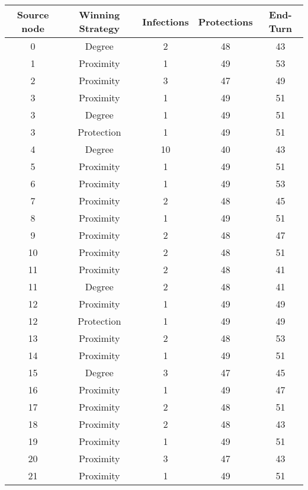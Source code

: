 \documentclass[results.tex]{subfiles}
\begin{document}
\begin{center}
  \begin{tabular}{| c || c | c | c | c |}
    \hline
    {\bfseries Source node} & {\bfseries Winning Strategy} & {\bfseries Infections} & {\bfseries Protections} & {\bfseries End-Turn} \\  %
    \hline\hline
    0 & Degree & 2 & 48 & 43 \\ 
    \hline
    1 & Proximity & 1 & 49 & 53 \\ 
    \hline
    2 & Proximity & 3 & 47 & 49 \\ 
    \hline
    3 & Proximity & 1 & 49 & 51 \\ 
    \hline
    3 & Degree & 1 & 49 & 51 \\ 
    \hline
    3 & Protection & 1 & 49 & 51 \\ 
    \hline
    4 & Degree & 10 & 40 & 43 \\ 
    \hline
    5 & Proximity & 1 & 49 & 51 \\ 
    \hline
    6 & Proximity & 1 & 49 & 53 \\ 
    \hline
    7 & Proximity & 2 & 48 & 45 \\ 
    \hline
    8 & Proximity & 1 & 49 & 51 \\ 
    \hline
    9 & Proximity & 2 & 48 & 47 \\ 
    \hline
    10 & Proximity & 2 & 48 & 51 \\ 
    \hline
    11 & Proximity & 2 & 48 & 41 \\ 
    \hline
    11 & Degree & 2 & 48 & 41 \\ 
    \hline
    12 & Proximity & 1 & 49 & 49 \\ 
    \hline
    12 & Protection & 1 & 49 & 49 \\ 
    \hline
    13 & Proximity & 2 & 48 & 53 \\ 
    \hline
    14 & Proximity & 1 & 49 & 51 \\ 
    \hline
    15 & Degree & 3 & 47 & 45 \\ 
    \hline
    16 & Proximity & 1 & 49 & 47 \\ 
    \hline
    17 & Proximity & 2 & 48 & 51 \\ 
    \hline
    18 & Proximity & 2 & 48 & 43 \\ 
    \hline
    19 & Proximity & 1 & 49 & 51 \\ 
    \hline
    20 & Proximity & 3 & 47 & 43 \\ 
    \hline
    21 & Proximity & 1 & 49 & 51 \\ 

\end{tabular}
\end{center}
\end{document}
